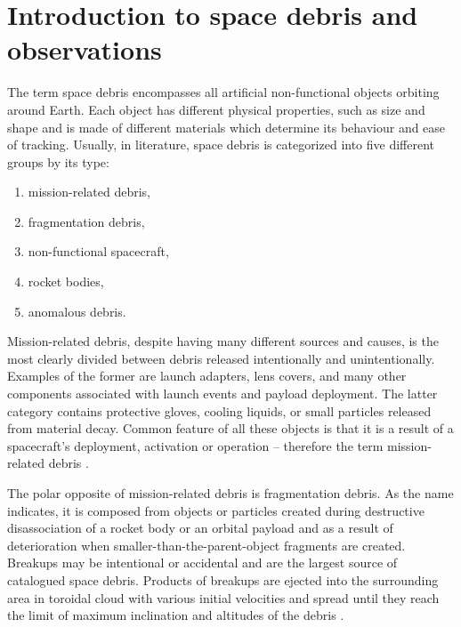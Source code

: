 \chapter{Introduction to space debris and observations}\label{chap:introduction}

The term space debris encompasses all artificial non-functional objects orbiting around Earth. Each object has different physical properties, such as size and shape and is made of different materials which determine its behaviour and ease of tracking. Usually, in literature, space debris is categorized into five different groups by its type:
\begin{enumerate}
	\item mission-related debris,
	\item fragmentation debris,
	\item non-functional spacecraft,
	\item rocket bodies,
	\item anomalous debris.
\end{enumerate}

	Mission-related debris, despite having many different sources and causes, is the most clearly divided between debris released intentionally and unintentionally. Examples of the former are launch adapters, lens covers, and many other components associated with launch events and payload deployment. The latter category contains protective gloves, cooling liquids, or small particles released from material decay. Common feature of all these objects is that it is a result of a spacecraft's deployment, activation or operation -- therefore the term mission-related debris \citep{klinkrad2006space}. 
	
	The polar opposite of mission-related debris is fragmentation debris. As the name indicates, it is composed from objects or particles created during destructive disassociation of a rocket body or an orbital payload and as a result of deterioration when smaller-than-the-parent-object fragments are created. Breakups may be intentional or accidental and are the largest source of catalogued space debris. Products of breakups are ejected into the surrounding area in toroidal cloud with various initial velocities and spread until they reach the limit of maximum inclination and altitudes of the debris \citep{united1999technical}.
	

